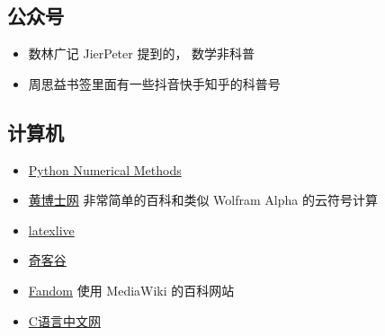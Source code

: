 \subsection{公众号}
\begin{itemize}
\item 数林广记 JierPeter 提到的， 数学非科普
\item 周思益书签里面有一些抖音快手知乎的科普号
\end{itemize}

\subsection{计算机}
\begin{itemize}
\item \href{https://pythonnumericalmethods.berkeley.edu/notebooks/Index.html}{Python Numerical Methods}
\item \href{http://www.drhuang.com/}{黄博士网} 非常简单的百科和类似 Wolfram Alpha 的云符号计算
\item \href{https://www.latexlive.com/}{latexlive}
\item \href{https://www.qikegu.com/}{奇客谷}
\item \href{https://harrypotter.fandom.com/zh/wiki/Special:%E7%94%A8%E6%88%B7%E8%B4%A1%E7%8C%AE/Laoxie.H}{Fandom} 使用 MediaWiki 的百科网站
\item \href{http://c.biancheng.net/}{C语言中文网}
\end{itemize}

